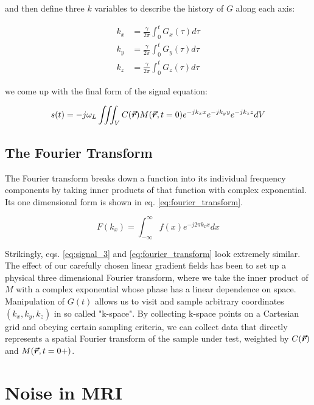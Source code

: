 and then define three $k$ variables to describe the history of $G$ along each axis:

\begin{equation}\label{k_space}
    \begin{aligned}
        k_x &= \frac{\gamma}{2\pi} \int_0^t G_x(\tau) d\tau\\
        k_y &= \frac{\gamma}{2\pi} \int_0^t G_y(\tau) d\tau\\
        k_z &= \frac{\gamma}{2\pi} \int_0^t G_z(\tau) d\tau
    \end{aligned}
\end{equation}

we come up with the final form of the signal equation:

\begin{equation}\label{eq:signal_3}
    s(t) = - j \omega_L \iiint_V C(\bm{\vec{r}}) M(\bm{\vec{r}},t=0) e^{-j k_x x} e^{-j k_y y} e^{-j k_z z} dV 
\end{equation}

\subsection{The Fourier Transform}
The Fourier transform breaks down a function into its individual frequency components by taking inner products of that
function with complex exponential. Its one dimensional form is shown in eq. \ref{eq:fourier_transform}.

\begin{equation}\label{eq:fourier_transform}
    F(k_x) = \int_{-\infty}^{\infty} f(x)e^{-j2\pi k_x x} dx
\end{equation}

Strikingly, eqs. \ref{eq:signal_3} and \ref{eq:fourier_transform} look extremely similar. The effect of our carefully
chosen linear gradient fields has been to set up a physical three dimensional Fourier transform, where we take the inner
product of $M$ with a complex exponential whose phase has a linear dependence on space. Manipulation of $G(t)$ allows us
to visit and sample arbitrary coordinates $(k_x,k_y,k_z)$ in so called "k-space".  By collecting k-space points on a
Cartesian grid and obeying certain sampling criteria, we can collect data that directly represents a spatial Fourier
transform of the sample under test, weighted by $C(\bm{\vec{r}})$ and $M(\bm{\vec{r}},t=0+)$.

\section{Noise in MRI}
